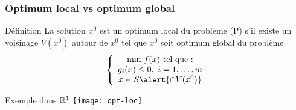 \documentclass{beamer}
\newcommand{\R}{{\ensuremath\mathbb{R}}}
\begin{document}
\begin{frame}
{  }
\end{frame}

\begin{frame}
  \frametitle{Optimum local vs optimum global}

  \begin{block}{Définition}
    La solution $x^0$ est un optimum local du problème (P) s'il existe un voisinage
    $V(x^0)$ autour de $x^0$ tel que $x^0$ soit optimum global du problème
  \[
  \left\{
  \begin{array}{c}
    \text{min} \ f(x) \ \text{tel que :} \\
    g_i(x) \leq 0, \ i = 1, \dots, m \\
    x \in S \alert{\cap V(x^0)}
  \end{array}
  \right.
  \]
  \end{block}

  \begin{exampleblock}{Exemple dans $\R^1$}
    \centering
    \texttt{[image: opt-loc]}
  \end{exampleblock}
  
\end{frame}



\end{document}
